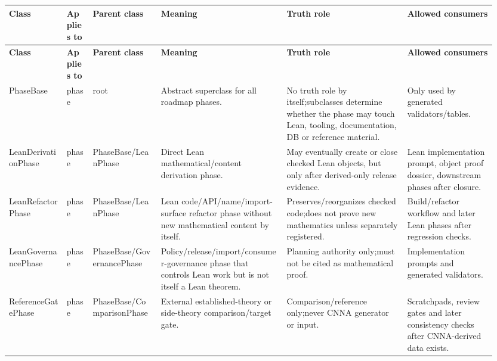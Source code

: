 \small
{}
\begin{longtable}{L{0.115\linewidth} L{0.055\linewidth} L{0.135\linewidth} L{0.245\linewidth} L{0.23\linewidth} L{0.17\linewidth}}
\hline
\textbf{Class} & \textbf{Applies to} & \textbf{Parent class} & \textbf{Meaning} & \textbf{Truth role} & \textbf{Allowed consumers}\\
\hline
\endfirsthead
\hline
\textbf{Class} & \textbf{Applies to} & \textbf{Parent class} & \textbf{Meaning} & \textbf{Truth role} & \textbf{Allowed consumers}\\
\hline
\endhead
PhaseBase & phase & root & Abstract superclass for all roadmap phases. & No truth role by itself;\newline subclasses determine whether the phase may touch Lean, tooling, documentation, DB or reference material. & Only used by generated validators/\allowbreak{}tables.\\
\hline
\addlinespace[0.24em]
LeanDerivationPhase & phase & PhaseBase/\allowbreak{}LeanPhase & Direct Lean mathematical/\allowbreak{}content derivation phase. & May eventually create or close checked Lean objects, but only after derived-only release evidence. & Lean implementation prompt, object proof dossier, downstream phases after closure.\\
\hline
\addlinespace[0.24em]
LeanRefactorPhase & phase & PhaseBase/\allowbreak{}LeanPhase & Lean code/\allowbreak{}API/\allowbreak{}name/\allowbreak{}import-surface refactor phase without new mathematical content by itself. & Preserves/\allowbreak{}reorganizes checked code;\newline does not prove new mathematics unless separately registered. & Build/\allowbreak{}refactor workflow and later Lean phases after regression checks.\\
\hline
\addlinespace[0.24em]
LeanGovernancePhase & phase & PhaseBase/\allowbreak{}GovernancePhase & Policy/\allowbreak{}release/\allowbreak{}import/\allowbreak{}consumer-governance phase that controls Lean work but is not itself a Lean theorem. & Planning authority only;\newline must not be cited as mathematical proof. & Implementation prompts and generated validators.\\
\hline
\addlinespace[0.24em]
ReferenceGatePhase & phase & PhaseBase/\allowbreak{}ComparisonPhase & External established-theory or side-theory comparison/\allowbreak{}target gate. & Comparison/\allowbreak{}reference only;\newline never CNNA generator or input. & Scratchpads, review gates and later consistency checks after CNNA-derived data exists.\\

\end{longtable}
